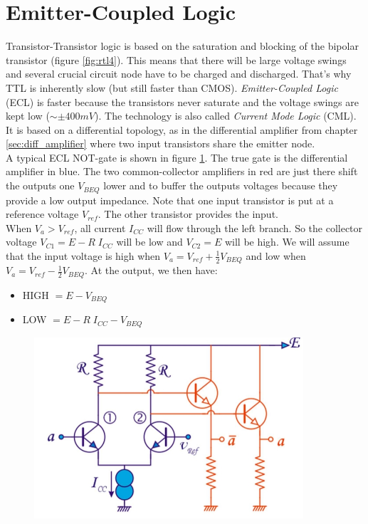 \section{Emitter-Coupled Logic}
\label{sec:ecl}
Transistor-Transistor logic is based on the saturation and blocking of the bipolar transistor (figure \ref{fig:rtl4}). This means that there will be large voltage swings and several crucial circuit node have to be charged and discharged. That's why TTL is inherently slow (but still faster than CMOS). \emph{Emitter-Coupled Logic} (ECL) is  faster because the transistors never saturate and the voltage swings are kept low ($\sim \pm 400 mV$). The technology is also called \emph{Current Mode Logic} (CML). It is based on a differential topology, as in the differential amplifier from chapter \ref{sec:diff_amplifier} where two input transistors share the emitter node.\\
A typical ECL NOT-gate is shown in figure \ref{fig:ecl1}. The true gate is the differential amplifier in blue. The two common-collector amplifiers in red are just there shift the outputs one $V_{BEQ}$ lower and to buffer the outputs voltages because they provide a low output impedance.  Note that one input transistor is put at a reference voltage $V_{ref}$. The other transistor provides the input.\\
When $V_a > V_{ref}$, all current $I_{CC}$ will flow through the left branch. So the collector voltage $V_{C1} = E-R\;I_{CC}$ will be low and $V_{C2} = E$ will be high. We will assume that the input voltage is high when $V_a = V_{ref} + \frac{1}{2} V_{BEQ}$ and low when $V_a = V_{ref} - \frac{1}{2} V_{BEQ}$.
At the output, we then have:
\begin{itemize}
	\item HIGH $= E - V_{BEQ}$
	\item LOW $= E - R\;I_{CC} - V_{BEQ}$
\end{itemize}
\begin{figure}[h!]
	\centering
	\includegraphics[width=10cm]{figures/ch15/ecl1.jpg}
	\caption{}
	\label{fig:ecl1}
\end{figure}
